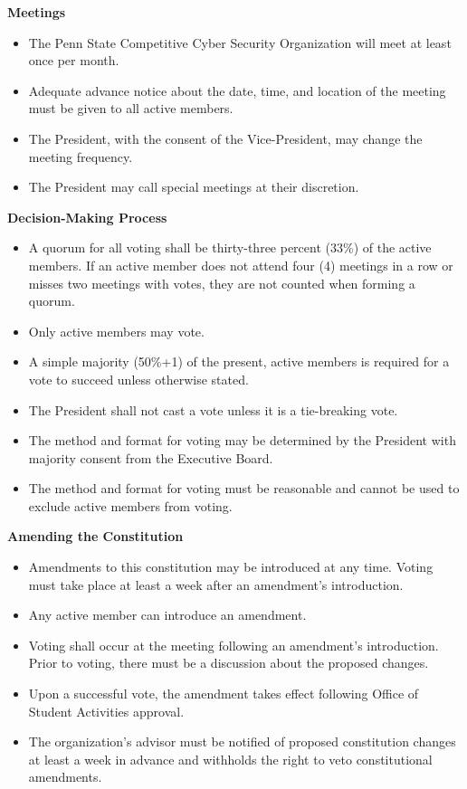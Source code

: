 \documentclass[12pt]{article}
\begin{document}
\textbf{Meetings}

\begin{itemize}
  \item The Penn State Competitive Cyber Security Organization will meet at least once per month.
  \item Adequate advance notice about the date, time, and location of the meeting must be given to all active members.
  \item The President, with the consent of the Vice-President, may change the meeting frequency.
  \item The President may call special meetings at their discretion.
\end{itemize}

\textbf{Decision-Making Process}

\begin{itemize}
  \item A quorum for all voting shall be thirty-three percent (33\%) of the active members. If an active member does not attend four (4) meetings in a row or misses two meetings with votes, they are not counted when forming a quorum.
  \item Only active members may vote.
  \item A simple majority (50\%+1) of the present, active members is required for a vote to succeed unless otherwise stated.
  \item The President shall not cast a vote unless it is a tie-breaking vote.
  \item The method and format for voting may be determined by the President with majority consent from the Executive Board.
  \item The method and format for voting must be reasonable and cannot be used to exclude active members from voting.
\end{itemize}

\textbf{Amending the Constitution}

\begin{itemize}
  \item Amendments to this constitution may be introduced at any time. Voting must take place at least a week after an amendment's introduction.
  \item Any active member can introduce an amendment.
  \item Voting shall occur at the meeting following an amendment's introduction. Prior to voting, there must be a discussion about the proposed changes.
  \item Upon a successful vote, the amendment takes effect following Office of Student Activities approval.
  \item The organization's advisor must be notified of proposed constitution changes at least a week in advance and withholds the right to veto constitutional amendments.
\end{itemize}
\end{document}
